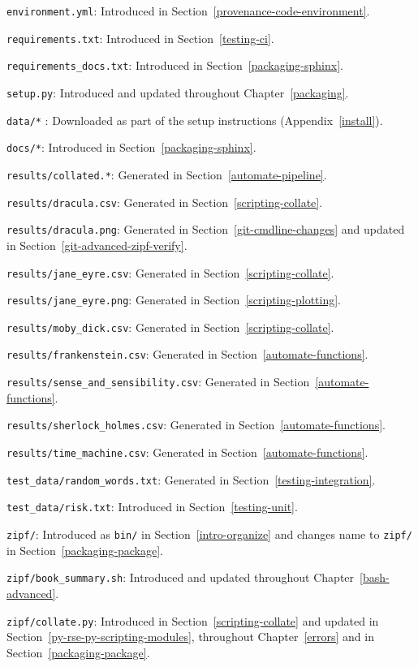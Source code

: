 \documentclass[
]{krantz}
\begin{document}
\texttt{environment.yml}: Introduced in Section~\ref{provenance-code-environment}.

\texttt{requirements.txt}: Introduced in Section~\ref{testing-ci}.

\texttt{requirements\_docs.txt}: Introduced in Section~\ref{packaging-sphinx}.

\texttt{setup.py}: Introduced and updated throughout Chapter~\ref{packaging}.

\texttt{data/*} : Downloaded as part of the setup instructions (Appendix~\ref{install}).

\texttt{docs/*}: Introduced in Section~\ref{packaging-sphinx}.

\texttt{results/collated.*}: Generated in Section~\ref{automate-pipeline}.

\texttt{results/dracula.csv}: Generated in Section~\ref{scripting-collate}.

\texttt{results/dracula.png}: Generated in Section~\ref{git-cmdline-changes} and updated in Section~\ref{git-advanced-zipf-verify}.

\texttt{results/jane\_eyre.csv}: Generated in Section~\ref{scripting-collate}.

\texttt{results/jane\_eyre.png}: Generated in Section~\ref{scripting-plotting}.

\texttt{results/moby\_dick.csv}: Generated in Section~\ref{scripting-collate}.

\texttt{results/frankenstein.csv}: Generated in Section~\ref{automate-functions}.

\texttt{results/sense\_and\_sensibility.csv}: Generated in Section~\ref{automate-functions}.

\texttt{results/sherlock\_holmes.csv}: Generated in Section~\ref{automate-functions}.

\texttt{results/time\_machine.csv}: Generated in Section~\ref{automate-functions}.

\texttt{test\_data/random\_words.txt}: Generated in Section~\ref{testing-integration}.

\texttt{test\_data/risk.txt}: Introduced in Section~\ref{testing-unit}.

\texttt{zipf/}: Introduced as \texttt{bin/} in Section~\ref{intro-organize} and
changes name to \texttt{zipf/} in Section~\ref{packaging-package}.

\texttt{zipf/book\_summary.sh}: Introduced and updated throughout Chapter~\ref{bash-advanced}.

\texttt{zipf/collate.py}: Introduced in Section~\ref{scripting-collate} and
updated in Section~\ref{py-rse-py-scripting-modules},
throughout Chapter~\ref{errors} and in Section~\ref{packaging-package}.
\end{document}
